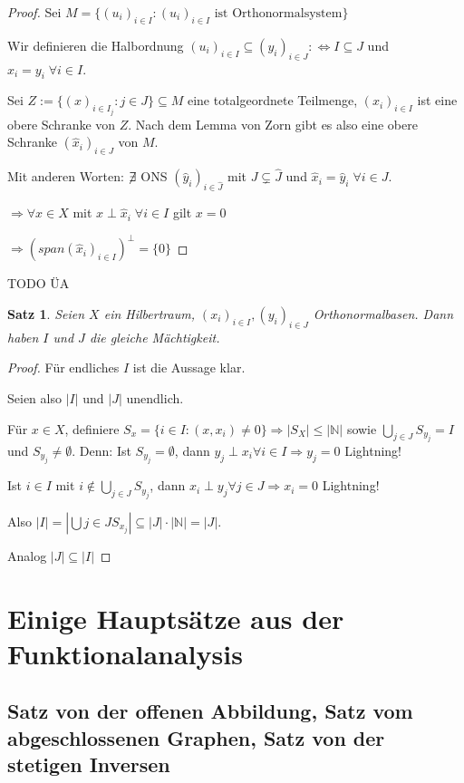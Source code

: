\documentclass[ngerman]{report}
\theoremstyle{plain}%
\newtheorem{thm}{Satz}[chapter]
\theoremstyle{definition}%
\theoremstyle{myStyle}
\newcommand{\N}{\mathbb{N}}
\newcommand{\df}[1][]{%
	\overset{#1}{\Rightarrow}
}
\newcommand{\aq}{\Leftrightarrow} %
\newcommand{\ff}[3]{(#1_#2)_{#2\in#3}}
\begin{document}
	\begin{proof}
		Sei $M = \{\ff{u}{i}{I} : \ff{u}{i}{I} \text{ ist Orthonormalsystem} \}$ \par
		Wir definieren die Halbordnung $\ff{u}{i}{I} \subseteq \ff{y}{i}{J} :\aq I \subseteq J$ und $x_i = y_i\; \forall i \in I$.\par
		Sei $Z := \{(x)_{i\in I_j} : j\in J \} \subseteq M$ eine totalgeordnete Teilmenge, 
		$\ff{x}{i}{I}$ ist eine obere Schranke von $Z$. Nach dem Lemma von Zorn gibt es also eine obere Schranke $(\hat{x}_i)_{i\in J}$ von $M$. \par
		Mit anderen Worten: $\centernot \exists$ ONS $\ff{\hat{{y}}}{i}{\hat{J}}$ mit $J \subsetneq \hat{J}$ und $\hat{x}_i = \hat{y}_i\; \forall i\in J.$\par
		$\df \forall x\in X$ mit $x\perp \hat{x}_i \;\forall i \in I$ gilt $x= 0$ \par
		$\df (span\ff{\hat{{x}}}{i}{I})^\perp = \{0\}$
	\end{proof}
 TODO ÜA \par 
 
	\begin{thm}
		Seien $X$ ein Hilbertraum, $\ff{x}{i}{I}, \ff{y}{i}{J}$ Orthonormalbasen. Dann haben $I$ und $J$ die gleiche Mächtigkeit.
	\end{thm}
	\begin{proof}
		Für endliches $I$ ist die Aussage klar. \par
		Seien also $|I|$ und $|J|$ unendlich.  \par
		Für $x\in X$, definiere $S_x = \{i\in I: (x,x_i) \neq 0\} \df |S_X| \leq |\N|$
		sowie $\bigcup_{j\in J} S_{y_j} = I$ und $S_{y_j} \neq \emptyset$. Denn:
		Ist $S_{y_j} = \emptyset$, dann $y_j \perp x_i \forall i \in I \df y_j =0$ Lightning! \par
		Ist $i\in I$ mit $i \not \in \bigcup_{j\in J} S_{y_j}$, dann $x_i \perp y_j \forall j\in J \df x_i = 0$ Lightning! \par
		Also $|I| = |\bigcup{j\in J} S_{x_j}| \subseteq |J| \cdot |\N| = |J|$. \par
		Analog $|J| \subseteq |I|$
	\end{proof}

\chapter{Einige Hauptsätze aus der Funktionalanalysis}			
	\section{Satz von der offenen Abbildung, Satz vom abgeschlossenen Graphen, Satz von der stetigen Inversen}
	
\end{document}
